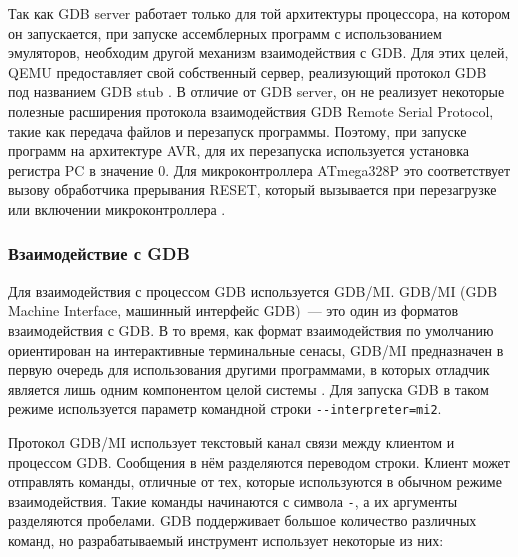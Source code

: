\documentclass[a4paper,article,14pt]{extarticle}
\begin{document}
Так как GDB server работает только для той архитектуры процессора, на котором он запускается, при запуске ассемблерных программ с использованием эмуляторов, необходим другой механизм взаимодействия с GDB. Для этих целей, QEMU предоставляет свой собственный сервер, реализующий протокол GDB под названием GDB stub \cite{gdbstub}. В отличие от GDB server, он не реализует некоторые полезные расширения протокола взаимодействия GDB Remote Serial Protocol, такие как передача файлов и перезапуск программы. Поэтому, при запуске программ на архитектуре AVR, для их перезапуска используется установка регистра PC в значение 0. Для микроконтроллера ATmega328P это соответствует вызову обработчика прерывания RESET, который вызывается при перезагрузке или включении микроконтроллера \cite{atmega328p}.

\subsubsection{Взаимодействие с GDB}

Для взаимодействия с процессом GDB используется GDB/MI. GDB/MI (GDB Machine Interface, машинный интерфейс GDB)~--- это один из форматов взаимодействия с GDB. В то время, как формат взаимодействия по умолчанию ориентирован на интерактивные терминальные сенасы, GDB/MI предназначен в первую очередь для использования другими программами, в которых отладчик является лишь одним компонентом целой системы \cite{gdb}. Для запуска GDB в таком режиме используется параметр командной строки \texttt{-{}-interpreter=mi2}.

Протокол GDB/MI использует текстовый канал связи между клиентом и процессом GDB. Сообщения в нём разделяются переводом строки. Клиент может отправлять команды, отличные от тех, которые используются в обычном режиме взаимодействия. Такие команды начинаются с символа \texttt{-}, а их аргументы разделяются пробелами. GDB поддерживает большое количество различных команд, но разрабатываемый инструмент использует некоторые из них:
\end{document}
